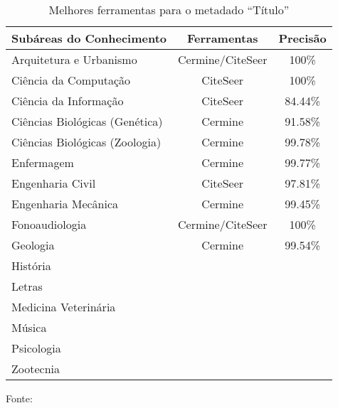 \begin{table}
    \caption{Melhores ferramentas para o metadado ``Título''}
    \begin{center}
        \begin{tabular}{|l|c|c|}
            \hline 
            \textbf{Subáreas do Conhecimento} & \textbf{Ferramentas} & \textbf{Precisão} \\ 
            \hline 
            Arquitetura e Urbanismo & Cermine/CiteSeer & 100\% \\ \hline
            Ciência da Computação & CiteSeer & 100\% \\ \hline
            Ciência da Informação & CiteSeer & 84.44\% \\ \hline
            Ciências Biológicas (Genética) & Cermine & 91.58\% \\ \hline
            Ciências Biológicas (Zoologia) & Cermine & 99.78\% \\ \hline
            Enfermagem & Cermine & 99.77\% \\ \hline
            Engenharia Civil & CiteSeer & 97.81\% \\ \hline
            Engenharia Mecânica & Cermine & 99.45\% \\ \hline
            Fonoaudiologia & Cermine/CiteSeer & 100\% \\ \hline
            Geologia & Cermine & 99.54\% \\ \hline
            História &  & \\ \hline
            Letras &  & \\ \hline
            Medicina Veterinária &  & \\ \hline
            Música &  & \\ \hline
            Psicologia &  & \\ \hline
            Zootecnia &  & \\ \hline
        \end{tabular}
    \end{center}
    \center\footnotesize{Fonte: }
    \label{tab:areas-title-tools}
\end{table}


